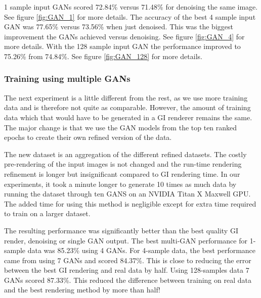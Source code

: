 \documentclass[10pt,twocolumn,letterpaper]{article}
\begin{document}
1 sample input GANs scored 72.84\% versus 71.48\% for denoising the same image. See figure \ref{fig:GAN_1} for more details.  The accuracy of the best 4 sample input GAN was 77.65\% versus 73.56\% when just denoised. This was the biggest improvement the GANs achieved versus denoising. See figure \ref{fig:GAN_4} for more details.  With the 128 sample input GAN the performance improved to 75.26\% from 74.84\%. See figure \ref{fig:GAN_128} for more details.
\subsubsection{Training using multiple GANs} \label{sec:multigans}
The next experiment is a little different from the rest, as we use more training data and is therefore not quite as comparable.  However, the amount of training data which that would have to be generated in a GI renderer remains the same.  The major change is that we use the GAN models from the top ten ranked epochs to create their own refined version of the data.

The new dataset is an aggregation of the different refined datasets.  The costly pre-rendering of the input images is not changed and the run-time rendering refinement is longer but insignificant compared to GI rendering time.  In our experiments, it took a minute longer to generate 10 times as much data by running the dataset through ten GANS on an NVIDIA Titan X Maxwell GPU. %
The added time for using this method is negligible except for extra time required to train on a larger dataset.

The resulting performance was significantly better than the best quality GI render, denoising or single GAN output.  The best multi-GAN performance for 1-sample data was 85.23\% using 4 GANs.  For 4-sample data, the best performance came from using 7 GANs and scored 84.37\%. This is close to reducing the error between the best GI rendering and real data by half. Using 128-samples data 7 GANs scored 87.33\%. This reduced the difference between training on real data and the best rendering method by more than half!
\end{document}
